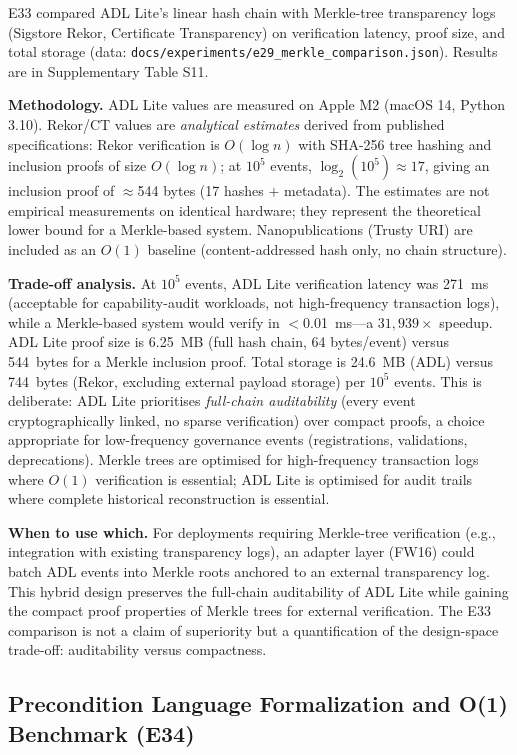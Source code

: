 E33 compared ADL Lite's linear hash chain with Merkle-tree transparency logs (Sigstore Rekor, Certificate Transparency) on verification latency, proof size, and total storage (data: \texttt{docs/experiments/e29\_merkle\_comparison.json}). Results are in Supplementary Table S11.


\textbf{Methodology.} ADL Lite values are measured on Apple M2 (macOS 14, Python 3.10). Rekor/CT values are \emph{analytical estimates} derived from published specifications: Rekor verification is $O(\log n)$ with SHA-256 tree hashing and inclusion proofs of size $O(\log n)$; at $10^5$ events, $\log_2(10^5) \approx 17$, giving an inclusion proof of $\approx$544 bytes (17 hashes $+$ metadata). The estimates are not empirical measurements on identical hardware; they represent the theoretical lower bound for a Merkle-based system. Nanopublications (Trusty URI) are included as an $O(1)$ baseline (content-addressed hash only, no chain structure).

\textbf{Trade-off analysis.} At $10^5$ events, ADL Lite verification latency was 271~ms (acceptable for capability-audit workloads, not high-frequency transaction logs), while a Merkle-based system would verify in $<$0.01~ms---a $31{,}939\times$ speedup. ADL Lite proof size is 6.25~MB (full hash chain, 64 bytes/event) versus 544~bytes for a Merkle inclusion proof. Total storage is 24.6~MB (ADL) versus 744~bytes (Rekor, excluding external payload storage) per $10^5$ events. This is deliberate: ADL Lite prioritises \emph{full-chain auditability} (every event cryptographically linked, no sparse verification) over compact proofs, a choice appropriate for low-frequency governance events (registrations, validations, deprecations). Merkle trees are optimised for high-frequency transaction logs where $O(1)$ verification is essential; ADL Lite is optimised for audit trails where complete historical reconstruction is essential.

\textbf{When to use which.} For deployments requiring Merkle-tree verification (e.g., integration with existing transparency logs), an adapter layer (FW16) could batch ADL events into Merkle roots anchored to an external transparency log. This hybrid design preserves the full-chain auditability of ADL Lite while gaining the compact proof properties of Merkle trees for external verification. The E33 comparison is not a claim of superiority but a quantification of the design-space trade-off: auditability versus compactness.

\subsection{Precondition Language Formalization and O(1) Benchmark (E34)}\label{subsec:e34}

